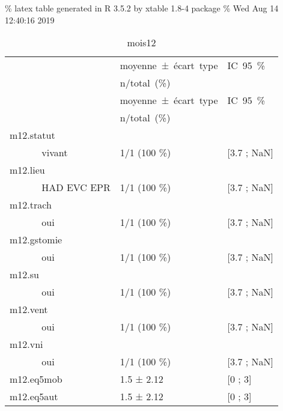 \documentclass[]{article}
\begin{document}
\% latex table generated in R 3.5.2 by xtable 1.8-4 package \% Wed Aug
14 12:40:16 2019

\begin{longtable}{lll}
  \toprule
  
                                                &\mbox{moyenne ± écart type}&\mbox{IC 95 \%}\\
                                                &\mbox{n/total (\%)}&\\
                                                \midrule
                                                \endfirsthead
                                                \midrule
                                                &\mbox{moyenne ± écart type}&\mbox{IC 95 \%}\\
                                                &\mbox{n/total (\%)}&\\
                                                \midrule
                                                \endhead
                                                \bottomrule
                                                \endfoot
                                                \bottomrule
                                                \caption{mois12}
                                                \label{tabdmois12}
                                                \endlastfoot
                                                m12.statut &   &   \\ 
  ~~~~~~ vivant & 1/1 (100 \%) &  [3.7 ; NaN] \\ 
  m12.lieu &   &   \\ 
  ~~~~~~ HAD EVC EPR & 1/1 (100 \%) &  [3.7 ; NaN] \\ 
  m12.trach &   &   \\ 
  ~~~~~~ oui & 1/1 (100 \%) &  [3.7 ; NaN] \\ 
  m12.gstomie &   &   \\ 
  ~~~~~~ oui & 1/1 (100 \%) &  [3.7 ; NaN] \\ 
  m12.su &   &   \\ 
  ~~~~~~ oui & 1/1 (100 \%) &  [3.7 ; NaN] \\ 
  m12.vent &   &   \\ 
  ~~~~~~ oui & 1/1 (100 \%) &  [3.7 ; NaN] \\ 
  m12.vni &   &   \\ 
  ~~~~~~ oui & 1/1 (100 \%) &  [3.7 ; NaN] \\ 
  m12.eq5mob & 1.5 ± 2.12 & [0 ; 3] \\ 
  m12.eq5aut & 1.5 ± 2.12 & [0 ; 3] \\ 

\end{longtable}
\end{document}
